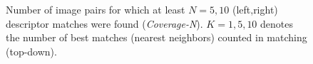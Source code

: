 \documentclass[review]{elsarticle}
\begin{document}
\begin{figure}[h!]
\begin{center}
\caption{Number of image pairs for which at least $N=5,10$ (left,right)
descriptor matches were found ({\em Coverage-N}). 
$K=1,5,10$ denotes the number of best matches (nearest neighbors)
counted in matching (top-down). 
\label{fig:coverage}}
\end{center}
\end{figure}
\end{document}
